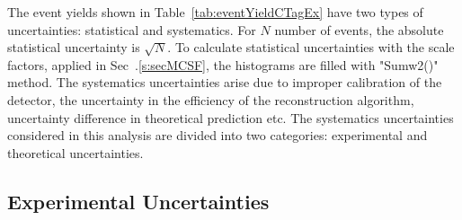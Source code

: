 The event yields shown in Table~\ref{tab:eventYieldCTagEx} have two types of uncertainties: statistical and systematics. For $N$ number of events, 
the absolute statistical uncertainty is $\sqrt{N}$. To calculate statistical uncertainties 
with the scale factors, applied in Sec~.\ref{s:secMCSF}, the histograms are filled with 
"Sumw2()" method. The systematics uncertainties arise due to improper calibration of the detector, 
the uncertainty in the efficiency of the reconstruction algorithm, uncertainty difference in 
theoretical prediction etc. The systematics uncertainties considered in this analysis are 
divided into two categories: experimental and theoretical uncertainties.

\subsection{Experimental Uncertainties}
